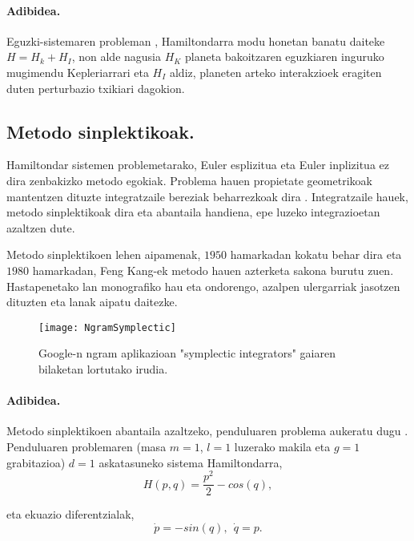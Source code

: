 \paragraph*{Adibidea.} Eguzki-sistemaren probleman \cite{Saha1992,Wisdom2006}, Hamiltondarra modu honetan banatu daiteke $H=H_k+H_I$, non alde nagusia $H_K$ planeta bakoitzaren eguzkiaren inguruko mugimendu Kepleriarrari eta $H_I$ aldiz, planeten arteko interakzioek eragiten duten perturbazio txikiari dagokion.   

\subsection{Metodo sinplektikoak.}

Hamiltondar sistemen problemetarako, Euler esplizitua eta Euler inplizitua ez dira zenbakizko metodo egokiak. Problema hauen propietate geometrikoak mantentzen dituzte integratzaile bereziak beharrezkoak dira \cite{JMSanz-Serna1994,SSerna2015b}. Integratzaile hauek, metodo sinplektikoak dira eta abantaila handiena, epe luzeko integrazioetan azaltzen dute.

Metodo sinplektikoen lehen aipamenak, $1950$ hamarkadan kokatu behar dira eta $1980$ hamarkadan, Feng Kang-ek metodo hauen azterketa sakona burutu zuen. Hastapenetako lan monografiko hau \cite{JMSanz-Serna1994} eta ondorengo, azalpen ulergarriak jasotzen dituzten \cite{Hairer2006} eta  \cite{Leimkuhler2004} lanak aipatu daitezke.    

\begin{figure}[h!]
\centering
\texttt{[image: NgramSymplectic]}
\caption{ \small Google-n ngram aplikazioan "symplectic integrators" gaiaren bilaketan lortutako irudia.}
\label{fig:NgramSymplectic}
\end{figure}

\paragraph*{Adibidea.} Metodo sinplektikoen abantaila azaltzeko, penduluaren problema aukeratu dugu \cite{Hairer2015a}. Penduluaren problemaren (masa $m=1$, $l=1$ luzerako makila eta $g=1$ grabitazioa) $d=1$ askatasuneko sistema Hamiltondarra,
\begin{equation}
H(p,q)= \frac{p^2}{2}- cos (q),
\end{equation}

eta ekuazio diferentzialak,
\begin{equation}
\label{eq:pendulua}
\dot{p}= -sin (q), \ \ \dot{q}=p.
\end{equation}

